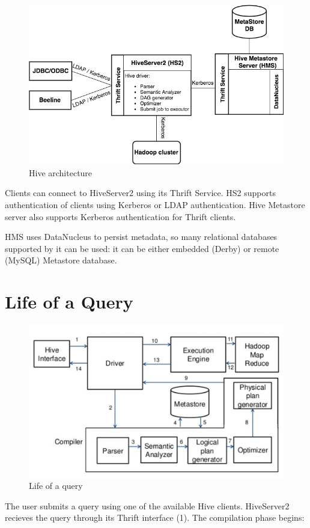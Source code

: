 \begin{figure}[H]
	\includegraphics[width=140mm, keepaspectratio]{figures/Hive_architecture.png}
	\centering
	\caption{Hive architecture}
\end{figure}

Clients can connect to HiveServer2 using its Thrift Service. HS2 supports authentication of clients using Kerberos or LDAP authentication. Hive Metastore server also supports Kerberos authentication for Thrift clients.

HMS uses DataNucleus to persist metadata, so many relational databases supported by it can be used: it can be either embedded (\eg Derby) or remote (\eg MySQL) Metastore database.

\section{Life of a Query}
\begin{figure}[H]
	\includegraphics[width=150mm, keepaspectratio]{figures/hive-query.png}
	\centering
	\caption{Life of a query  \cite{Hive-query-figure}}
\end{figure}
The user submits a query using one of the available Hive clients. HiveServer2 recieves the query through its Thrift interface (1). The compilation phase begins:

